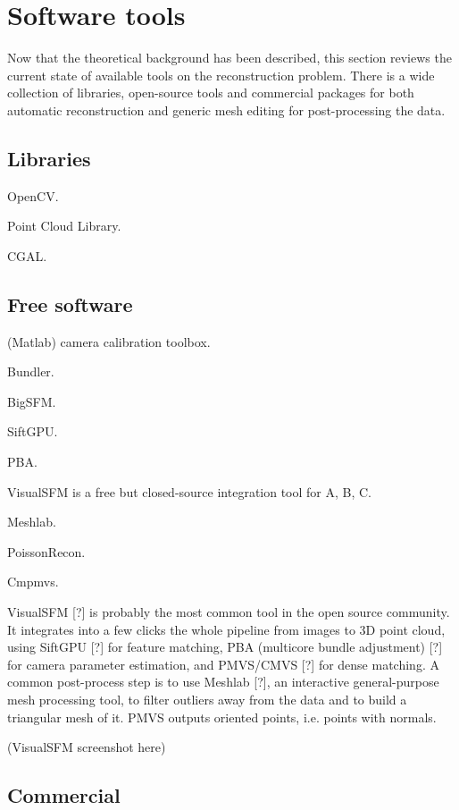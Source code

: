 \section{Software tools}

Now that the theoretical background has been described, this section reviews the current state of available tools on the reconstruction problem. There is a wide collection of libraries, open-source tools and commercial packages for both automatic reconstruction and generic mesh editing for post-processing the data.

\subsection{Libraries}

OpenCV.

Point Cloud Library.

CGAL.

\subsection{Free software}

(Matlab) camera calibration toolbox.

Bundler.

BigSFM.

SiftGPU.

PBA.

VisualSFM is a free but closed-source integration tool for A, B, C.

Meshlab.

PoissonRecon.

Cmpmvs.

VisualSFM [?] is probably the most common tool in the open source community.
It integrates into a few clicks the whole pipeline from images to 3D point cloud, using SiftGPU [?] for feature matching, PBA (multicore bundle adjustment) [?] for camera parameter estimation, and PMVS/CMVS [?] for dense matching.
A common post-process step is to use Meshlab [?], an interactive general-purpose mesh processing tool, to filter outliers away from the data and to build a triangular mesh of it. PMVS outputs oriented points, i.e. points with normals.

(VisualSFM screenshot here)

\subsection{Commercial}
